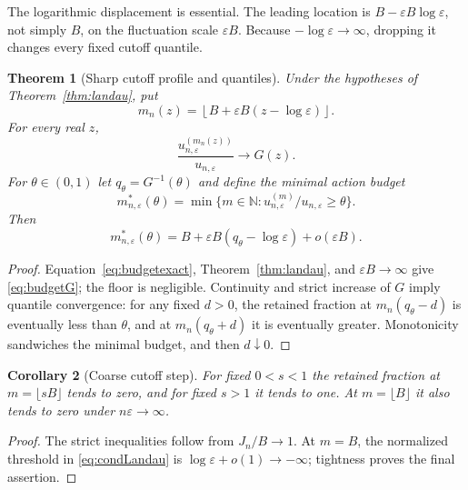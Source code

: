 \documentclass[11pt,a4paper]{article}
\newtheorem{theorem}{Theorem}[section]
\newtheorem{corollary}[theorem]{Corollary}
\theoremstyle{definition}\newtheorem{definition}[theorem]{Definition}
\theoremstyle{remark}\newtheorem{remark}[theorem]{Remark}
\newcommand{\eps}{\varepsilon}
\newcommand{\N}{\mathbb N}
\newcommand{\1}{\mathbf 1}
\begin{document}
The logarithmic displacement is essential. The leading location is
$B-\eps B\log\eps$, not simply $B$, on the fluctuation scale $\eps B$.
Because $-\log\eps\to\infty$, dropping it changes every fixed cutoff
quantile.

\begin{theorem}[Sharp cutoff profile and quantiles]\label{thm:budget}
Under the hypotheses of Theorem~\ref{thm:landau}, put
\begin{equation}\label{eq:budgetwindow}
 m_n(z)=\left\lfloor B+\eps B(z-\log\eps)\right\rfloor.
\end{equation}
For every real $z$,
\begin{equation}\label{eq:budgetG}
 \frac{u_{n,\eps}^{(m_n(z))}}{u_{n,\eps}}\longrightarrow G(z).
\end{equation}
For $\theta\in(0,1)$ let $q_\theta=G^{-1}(\theta)$ and define the
minimal action budget
\begin{equation}\label{eq:minbudget}
 m^*_{n,\eps}(\theta)=\min\{m\in\N:
              u_{n,\eps}^{(m)}/u_{n,\eps}\ge\theta\}.
\end{equation}
Then
\begin{equation}\label{eq:quantile}
 m^*_{n,\eps}(\theta)
 =B+\eps B(q_\theta-\log\eps)+o(\eps B).
\end{equation}
\end{theorem}
\begin{proof}
Equation~\eqref{eq:budgetexact}, Theorem~\ref{thm:landau}, and
$\eps B\to\infty$ give \eqref{eq:budgetG}; the floor is negligible.
Continuity and strict increase of $G$ imply quantile convergence: for
any fixed $d>0$, the retained fraction at $m_n(q_\theta-d)$ is eventually
less than $\theta$, and at $m_n(q_\theta+d)$ it is eventually greater.
Monotonicity sandwiches the minimal budget, and then $d\downarrow0$.
\end{proof}

\begin{corollary}[Coarse cutoff step]\label{cor:step}
For fixed $0<s<1$ the retained fraction at $m=\lfloor sB\rfloor$ tends to
zero, and for fixed $s>1$ it tends to one. At $m=\lfloor B\rfloor$ it
also tends to zero under $n\eps\to\infty$.
\end{corollary}
\begin{proof}
The strict inequalities follow from $J_n/B\to1$. At $m=B$, the
normalized threshold in \eqref{eq:condLandau} is $\log\eps+o(1)\to-\infty$;
tightness proves the final assertion.
\end{proof}
\end{document}
